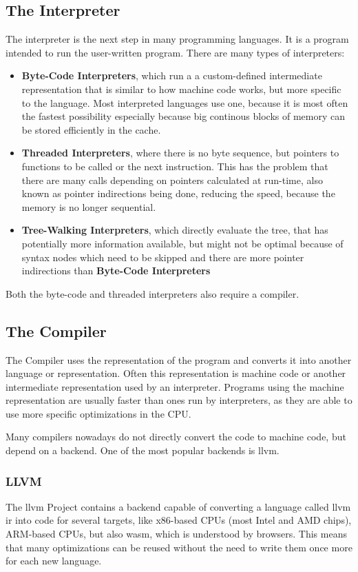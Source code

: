 \documentclass[12pt]{article}
\begin{document}
\subsection{The Interpreter}
The interpreter is the next step in many programming languages.
It is a program intended to run the user-written program.
There are many types of interpreters:
\begin{itemize}
	\item \textbf{Byte-Code Interpreters}, which run a
	      a custom-defined intermediate representation that is similar to how
	      machine code works, but more specific to the language. Most interpreted languages
	      use one, because it is most often the fastest possibility especially
	      because big continous blocks of memory can be stored efficiently in the cache.
	\item \textbf{Threaded Interpreters}, where there is no byte sequence, but pointers
	      to functions to be called or the next instruction. This has the problem that there
	      are many calls depending on pointers calculated at run-time, also known as pointer indirections
	      being done, reducing the speed, because the memory is no longer sequential.
	\item \textbf{Tree-Walking Interpreters}, which directly evaluate the tree,
	      that has potentially more information available, but might not be optimal because of syntax
	      nodes which need to be skipped and there are more pointer indirections than
	      \textbf{Byte-Code Interpreters}
\end{itemize}
Both the byte-code and threaded interpreters also require a compiler.

\subsection{The Compiler}
The Compiler uses the representation of the program and converts it into another language or representation.
Often this representation is machine code or another intermediate representation used by an interpreter.
Programs using the machine representation are usually
faster than ones run by interpreters, as they are able to use more specific
optimizations in the CPU.

Many compilers nowadays do not directly convert the code to machine code,
but depend on a backend. One of the most popular backends is \Gls{llvm}.

\subsubsection{LLVM}
The \Gls{llvm} Project contains a backend capable of converting a language called
\Gls{llvm} \Gls{ir} into code for several targets,
like x86-based CPUs (most Intel and AMD chips), ARM-based CPUs, but also
\Gls{wasm}, which is understood by browsers.
This means that many optimizations can be reused without the need to
write them once more for each new language.
\end{document}
